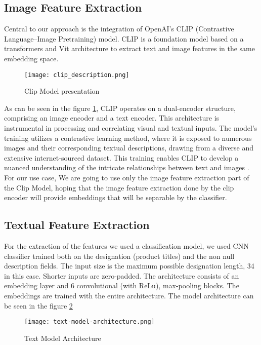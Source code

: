 \subsection{Image Feature Extraction}

Central to our approach is the integration of OpenAI's CLIP (Contrastive Language–Image Pretraining) model. CLIP is a foundation model based on a transformers and Vit architecture to extract text and image features in the same embedding space.


\begin{figure}[H]
    \centering
    \texttt{[image: clip\_description.png]}
    \caption{\label{fig:clip-architecture}Clip Model presentation}
\end{figure}


As can be seen in the figure \ref{fig:clip-architecture}, CLIP operates on a dual-encoder structure, comprising an image encoder and a text encoder. This architecture is instrumental in processing and correlating visual and textual inputs. The model's training utilizes a contrastive learning method, where it is exposed to numerous images and their corresponding textual descriptions, drawing from a diverse and extensive internet-sourced dataset. This training enables CLIP to develop a nuanced understanding of the intricate relationships between text and images \cite{radford-2021}.
For our use case, We are going to use only the image feature extraction part of the Clip Model, hoping that the image feature extraction done by the clip encoder will provide embeddings that will be separable by the classifier.




\subsection{Textual Feature Extraction}

For the extraction of the features we used a classification model, we used CNN classifier trained both on the designation (product titles) and the non null description fields. The input size is the maximum possible designation length, 34 in this case. Shorter inputs are zero-padded. The architecture consists of an embedding layer and 6 convolutional (with ReLu), max-pooling blocks. The embeddings are trained with the entire architecture. The model architecture can be seen in the figure \ref{fig:text-model}

\begin{figure}[H]
    \centering
    \texttt{[image: text-model-architecture.png]}
    \caption{Text Model Architecture}
    \label{fig:text-model}
\end{figure}


